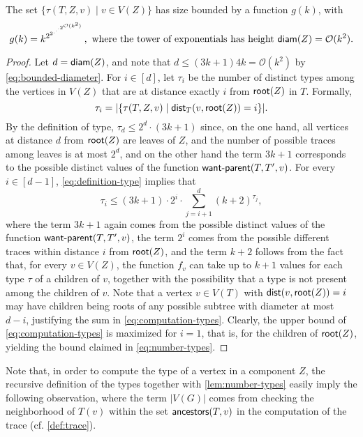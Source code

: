 \documentclass[a4paper,UKenglish,cleveref, autoref, thm-restate]{lipics-v2021}
\renewcommand{\root}{{\sf root}\xspace}
\newcommand{\anc}{{\sf ancestors}\xspace}
\newcommand{\dist}{{\sf dist}\xspace}
\newcommand{\diam}{{\sf diam}\xspace}
\newcommand{\wantparent}{{\sf {\sf want{\text -}parent}}\xspace}
\newcommand{\Ocal}{{\mathcal O}\xspace}
\begin{document}
\begin{lemma}\label{lem:number-types}
The set $\{\tau(T,Z,v) \mid v \in V(Z)\}$ has size bounded by a function $g(k)$, with
\begin{equation}\label{eq:number-types}
    g(k) = k^{2^{2^{.^{.^{.{2^{\Ocal(k^2)}}}}}}}, \text{ where the tower of exponentials has height $\diam(Z) = \Ocal(k^2)$.}
\end{equation}
\end{lemma}
\begin{proof}
Let $d = \diam(Z)$, and note that $d \leq (3k+1)4k = \Ocal(k^2)$ by \autoref{eq:bounded-diameter}. For $i \in [d]$, let $\tau_i$ be the number of distinct types among the vertices in $V(Z)$ that are at distance exactly $i$ from  $\root(Z)$ in $T$. Formally,
\begin{equation}
\tau_i = |\{\tau(T,Z,v) \mid \dist_T(v,\root(Z)) = i\}|.
\end{equation}
By the definition of type, $\tau_d \leq 2^d \cdot (3k+1)$ since, on the one hand, all vertices at distance $d$ from $\root(Z)$ are leaves of $Z$, and the number of possible traces among leaves is at most $2^d$, and on the other hand the term $3k+1$ corresponds to the possible distinct values of the function $\wantparent(T,T',v)$. For every $i \in [d-1]$, \autoref{eq:definition-type} implies that
\begin{equation}\label{eq:computation-types}
    \tau_i \leq (3k+1) \cdot 2^i \cdot \sum_{j=i+1}^d (k+2)^{\tau_{j}},
\end{equation}
where the term $3k+1$ again comes from the possible distinct values of the function $\wantparent(T,T',v)$, the term $2^i$ comes from the possible different traces within distance $i$ from $\root(Z)$, and the term $k+2$ follows from the fact that, for every $v \in V(Z)$, the function $f_v$ can take up to $k+1$ values for each type $\tau$ of a children of $v$, together with the possibility that a type is not present among the children of $v$. Note that a vertex $v \in V(T)$ with $\dist(v,\root(Z)) = i$ may have children being roots of any possible subtree with diameter at most $d-i$, justifying the sum in  \autoref{eq:computation-types}. Clearly, the upper bound of \autoref{eq:computation-types} is maximized for $i=1$, that is, for the children of $\root(Z)$, yielding the bound claimed in \autoref{eq:number-types}.
\end{proof}


Note that, in order to compute the type of a vertex in a component $Z$, the recursive definition of the types together with \autoref{lem:number-types} easily imply the following observation, where the term $|V(G)|$ comes from checking the neighborhood of $T(v)$ within the set $\anc(T,v)$ in the computation of the trace (cf. \autoref{def:trace}).
\end{document}
